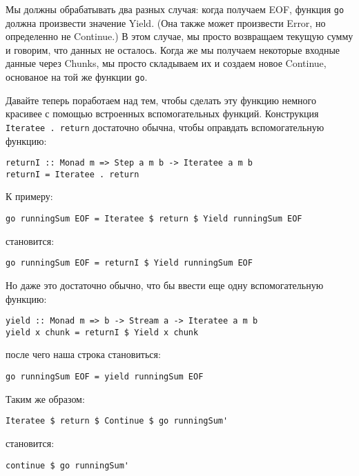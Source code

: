 Мы должны обрабатывать два разных случая: когда получаем EOF, функция \lstinline'go' должна произвести значение Yield. (Она также может произвести Error, но определенно не Continue.) В этом случае, мы просто возвращаем текущую сумму и говорим, что данных не осталось. Когда же мы получаем некоторые входные данные через Chunks, мы просто складываем их и создаем новое Continue, основаное на той же функции \lstinline'go'.

Давайте теперь поработаем над тем, чтобы сделать эту функцию немного красивее с помощью встроенных вспомогательных функций. Конструкция \lstinline'Iteratee . return' достаточно обычна, чтобы оправдать вспомогательную функцию:

\begin{lstlisting}
returnI :: Monad m => Step a m b -> Iteratee a m b
returnI = Iteratee . return
\end{lstlisting}

К примеру:

\begin{lstlisting}
go runningSum EOF = Iteratee $ return $ Yield runningSum EOF
\end{lstlisting}%

становится:

\begin{lstlisting}
go runningSum EOF = returnI $ Yield runningSum EOF
\end{lstlisting}%

Но даже это достаточно обычно, что бы ввести еще одну вспомогательную функцию:

\begin{lstlisting}
yield :: Monad m => b -> Stream a -> Iteratee a m b
yield x chunk = returnI $ Yield x chunk
\end{lstlisting}%

после чего наша строка становиться:

\begin{lstlisting}
go runningSum EOF = yield runningSum EOF
\end{lstlisting}

Таким же образом:

\begin{lstlisting}
Iteratee $ return $ Continue $ go runningSum'
\end{lstlisting}%

становится:

\begin{lstlisting}
continue $ go runningSum'
\end{lstlisting}%


